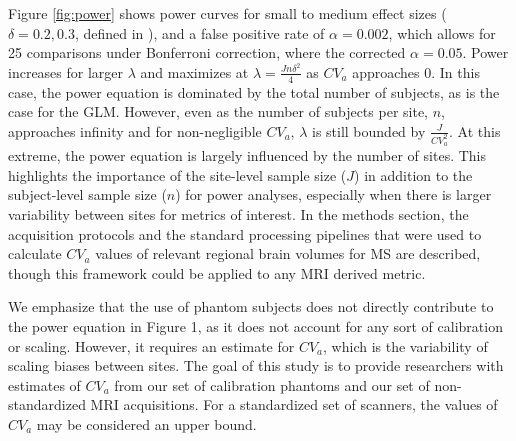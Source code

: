 Figure \ref{fig:power} shows power curves for small to medium effect sizes ($\delta = 0.2, 0.3$, defined in \cite{Raudenbush2000}), and a false positive rate of $\alpha = 0.002$, which allows for 25 comparisons under Bonferroni correction, where the corrected $\alpha = 0.05$. Power increases for larger $\lambda$  and maximizes at $\lambda = \frac{Jn\delta^2}{4}$ as $CV_a$ approaches 0. In this case, the power equation is dominated by the total number of subjects, as is the case for the GLM. However, even as the number of subjects per site, $n$, approaches infinity and for non-negligible $CV_a$, $\lambda$ is still bounded by $\frac{J}{CV_a^2}$. At this extreme, the  power equation is largely influenced by the number of sites. This highlights the importance of the site-level sample size ($J$) in addition to the subject-level sample size ($n$) for power analyses, especially when there is larger variability between sites for metrics of interest. In the methods section, the acquisition protocols and the standard processing pipelines that were used to calculate $CV_a$ values of relevant regional brain volumes for MS are described, though this framework could be applied to any MRI derived metric.

We emphasize that the use of phantom subjects does not directly contribute to the power equation in Figure 1, as it does not account for any sort of calibration or scaling. However, it requires an estimate for $CV_a$, which is the variability of scaling biases between sites. The goal of this study is to provide researchers with estimates of $CV_a$ from our set of calibration phantoms and our set of non-standardized MRI acquisitions. For a standardized set of scanners, the values of $CV_a$ may be considered an upper bound. 